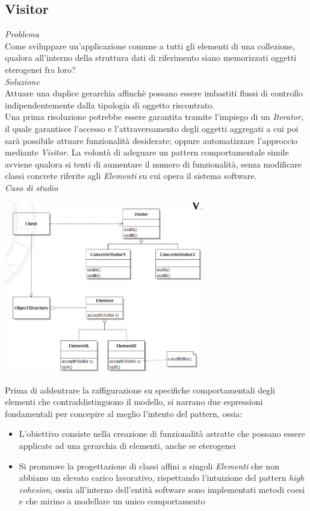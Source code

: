 \documentclass{article}
\begin{document}
\subsection*{Visitor}
\large
\textit{Problema}\\
Come sviluppare un'applicazione comune a tutti gli elementi di una collezione, qualora all'interno della struttura dati di riferimento siano memorizzati oggetti eterogenei fra loro?\vspace*{14pt}\\
\textit{Soluzione}\\
Attuare una duplice gerarchia affinchè possano essere imbastiti flussi di controllo indipendentemente dalla tipologia di oggetto riscontrato.\vspace*{14pt}\\
Una prima risoluzione potrebbe essere garantita tramite l'impiego di un \textit{Iterator}, il quale garantisce l'accesso e l'attraversamento degli oggetti aggregati a cui poi sarà possibile attuare funzionalità desiderate; oppure automatizzare l'approccio mediante \textit{Visitor}.
La volontà di adeguare un pattern comportamentale simile avviene qualora si tenti di aumentare il numero di funzionalità, senza modificare classi concrete riferite agli \textit{Elementi} su cui opera il sistema software.\vspace*{14pt}\\
\textit{Caso di studio}\\
\begin{center}
    \includegraphics[width=0.65\textwidth]{foto 2.png}
\end{center}
Prima di addentrare la raffigurazione su specifiche comportamentali degli elementi che contraddistinguono il modello, si narrano due espressioni fondamentali per concepire al meglio l'intento del pattern, ossia:
\begin{itemize}[label={-}]
    \itemsep0em
    \item L'obiettivo consiste nella creazione di funzionalità astratte che possano essere applicate ad una gerarchia di elementi, anche se eterogenei
    \item Si promuove la progettazione di classi affini a singoli \textit{Elementi} che non abbiano un elevato carico lavorativo, rispettando l'intuizione del pattern \textit{high cohesion}, ossia all'interno dell'entità software sono implementati metodi coesi e che mirino a modellare un unico comportamento
\end{itemize}
\end{document}
